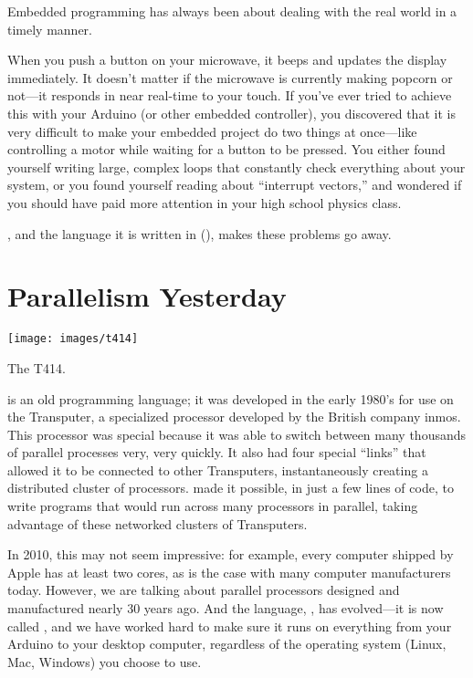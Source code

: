 Embedded programming has always been about dealing with the real world in a timely manner.

When you push a button on your microwave, it beeps and updates the display immediately. It doesn't matter if the microwave is currently making popcorn or not---it responds in near real-time to your touch. If you've ever tried to achieve this with your Arduino (or other embedded controller), you discovered that it is very difficult to make your embedded project do two things at once---like controlling a motor while waiting for a button to be pressed. You either found yourself writing large, complex loops that constantly check everything about your system, or you found yourself reading about ``interrupt vectors,'' and wondered if you should have paid more attention in your high school physics class.

\plumbing, and the language it is written in (\occam), makes these problems go away.

\newpage

\section*{Parallelism Yesterday}
\begin{floatingfigure}[r]{0.4\linewidth}
	  \begin{center}
    	\texttt{[image: images/t414]}
			\captionsetup{labelformat=empty,justification=centering}
   		\caption{The T414.}
    	\label{image:t414}
  \end{center}
\end{floatingfigure}


\justoccam is an old programming language; it was developed in the early 1980's for use on the Transputer, a specialized processor developed by the British company inmos. This processor was special because it was able to switch between many thousands of parallel processes very, very quickly. It also had four special ``links'' that allowed it to be connected to other Transputers, instantaneously creating a distributed cluster of processors. \justoccam made it possible, in just a few lines of code, to write programs that would run across many processors in parallel, taking advantage of these networked clusters of Transputers.

In 2010, this may not seem impressive: for example, every computer shipped by Apple has at least two cores, as is the case with many computer manufacturers today. However, we are talking about {\strong parallel processors designed and manufactured nearly 30 years ago}. And the language, \justoccam, has evolved---it is now called \occam, and we have worked hard to make sure it runs on everything from your Arduino to your desktop computer, regardless of the operating system (Linux, Mac, Windows) you choose to use.

